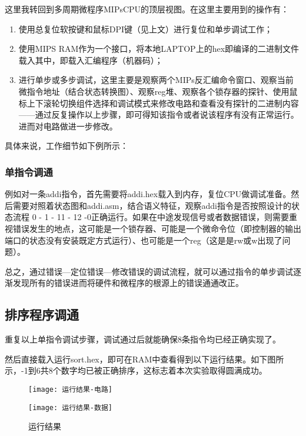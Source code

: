 \documentclass[withoutpreface]{cumcmthesis} %
\begin{document}
这里我转回到多周期微程序MIPsCPU的顶层视图。在这里主要用到的操作有：\begin{enumerate}\item 使用总复位软按键和鼠标DPI键（见上文）进行复位和单步调试工作；\item 使用MIPS RAM作为一个接口，将本地LAPTOP上的hex即编译的二进制文件载入其中，即载入汇编程序（机器码）；\item 进行单步或多步调试，这里主要是观察两个MIPs反汇编命令窗口、观察当前微指令地址（结合状态转换图）、观察reg堆、观察各个锁存器的探针、使用鼠标上下滚轮切换组件选择和调试模式来修改电路和查看没有探针的二进制内容——通过反复操作以上步骤，即可得知该指令或者说该程序有没有正常运行。进而对电路做进一步修改。\end{enumerate}

具体来说，工作细节如下例所示：
\subsubsection{单指令调通}
例如对一条addi指令，首先需要将addi.hex载入到内存，复位CPU做调试准备。然后需要对照着状态图和addi.asm，结合语义特征，观察addi指令是否按照设计的状态流程 0 - 1 - 11 - 12 -0正确运行。如果在中途发现信号或者数据错误，则需要重视错误发生的地点，这可能是一个锁存器、可能是一个微命令位（即控制器的输出端口的状态没有安装既定方式运行）、也可能是一个reg（这是是rw或w出现了问题）。

总之，通过错误—定位错误—修改错误的调试流程，就可以通过指令的单步调试逐渐发现所有的错误进而将硬件和微程序的根源上的错误通通改正。
\subsection{排序程序调通}
重复以上单指令调试步骤，调试通过后就能确保8条指令均已经正确实现了。

然后直接载入运行sort.hex，即可在RAM中查看得到以下运行结果。如下图所示，-1到6共8个数字均已被正确排序，这标志着本次实验取得圆满成功。
\begin{figure}[!htbp]
    \centering
    \begin{minipage}[c]{0.38\textwidth}
        \centering
        \texttt{[image: 运行结果-电路]}
    \end{minipage}
    \begin{minipage}[c]{0.38\textwidth}
        \centering
        \texttt{[image: 运行结果-数据]}
    \end{minipage}
    \caption{运行结果}
\end{figure}
\end{document}
